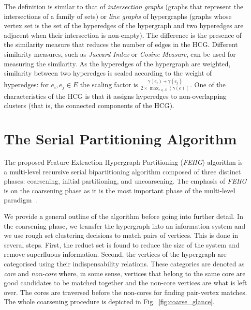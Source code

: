 \documentclass[twocolumn]{svjour3}          \smartqed
\begin{document}
The definition is similar to that of \textit{intersection graphs} \cite{erdos1966representation} (graphs that represent the intersections of a family of sets) or  \textit{line graphs} of  hypergraphs (graphs whose vertex set is the set of the hyperedges of the hypergraph and two hyperedges are adjacent when their intersection is non-empty). The difference is the presence of the similarity measure that reduces the number of edges in the HCG. Different similarity measures, such as \textit{Jaccard Index} or \textit{Cosine Measure}, can be used for measuring the similarity. As the hyperedges of the hypergraph are weighted, similarity between two hyperedges is scaled according to the weight of hyperedges: for $e_i,e_j \in E$ the scaling factor is $\frac{\gamma(e_i) + \gamma(e_j)} {2 \times \max_{e \in E}\left( \gamma(e) \right) }$. One of the characteristics of the HCG is that it assigns hyperedges to non-overlapping clusters (that is, the connected components of the HCG).

\section{The Serial Partitioning Algorithm}\label{sec:fehg_alg}


The proposed Feature Extraction Hypergraph Partitioning (\textit{FEHG}) algorithm is a multi-level recursive serial bipartitioning algorithm composed of three distinct phases: coarsening, initial partitioning, and uncoarsening. The emphasis of \textit{FEHG }is on the coarsening phase as it is the most important phase of the multi-level paradigm~\cite{karytech2002}. 

We provide a general outline of the algorithm before going into further detail. In the coarsening phase, we transfer the hypergraph into an information system and we use rough set clustering decisions to match pairs of vertices. This is done in several steps. First, the reduct set is found to reduce the size of the system and remove superfluous information. Second, the vertices of the hypergraph are categorised using their indispensability relations. These categories are denoted as \textit{core} and \textit{non-core} where, in some sense, vertices that belong to the same core are good candidates to be matched together and the non-core vertices are what is left over. The cores are traversed before the non-cores for finding pair-vertex matches. The whole coarsening procedure is depicted in Fig.~\ref{fig:coarse_glance}.
\end{document}
